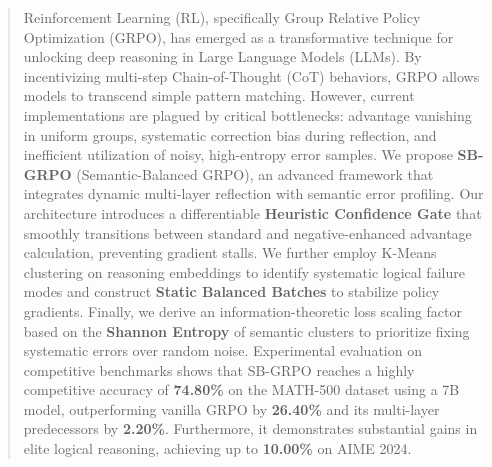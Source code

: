 \begin{abstract}
Reinforcement Learning (RL), specifically Group Relative Policy Optimization (GRPO), has emerged as a transformative technique for unlocking deep reasoning in Large Language Models (LLMs). By incentivizing multi-step Chain-of-Thought (CoT) behaviors, GRPO allows models to transcend simple pattern matching. However, current implementations are plagued by critical bottlenecks: advantage vanishing in uniform groups, systematic correction bias during reflection, and inefficient utilization of noisy, high-entropy error samples. We propose \textbf{SB-GRPO} (Semantic-Balanced GRPO), an advanced framework that integrates dynamic multi-layer reflection with semantic error profiling. Our architecture introduces a differentiable \textbf{Heuristic Confidence Gate} that smoothly transitions between standard and negative-enhanced advantage calculation, preventing gradient stalls. We further employ K-Means clustering on reasoning embeddings to identify systematic logical failure modes and construct \textbf{Static Balanced Batches} to stabilize policy gradients. Finally, we derive an information-theoretic loss scaling factor based on the \textbf{Shannon Entropy} of semantic clusters to prioritize fixing systematic errors over random noise. Experimental evaluation on competitive benchmarks shows that SB-GRPO reaches a highly competitive accuracy of \textbf{74.80\%} on the MATH-500 dataset using a 7B model, outperforming vanilla GRPO by \textbf{26.40\%} and its multi-layer predecessors by \textbf{2.20\%}. Furthermore, it demonstrates substantial gains in elite logical reasoning, achieving up to \textbf{10.00\%} on AIME 2024.

\end{abstract}